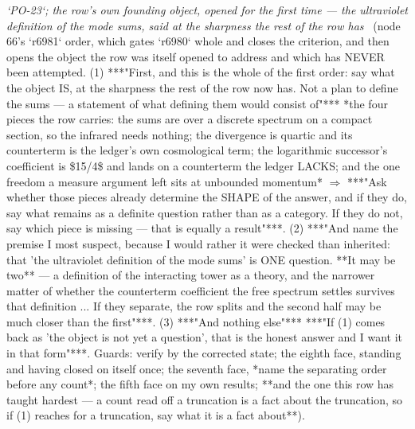 \begin{description}
\textit{`PO-23`; the row's own founding object, opened for the first time --- the ultraviolet definition of the mode sums, said at the sharpness the rest of the row has} \ (node 66's `r6981` order, which gates `r6980` whole and closes the criterion, and then opens the object the row was itself opened to address and which has NEVER been attempted. (1) ***"First, and this is the whole of the first order: say what the object IS, at the sharpness the rest of the row now has. Not a plan to define the sums --- a statement of what defining them would consist of"***  *the four pieces the row carries: the sums are over a discrete spectrum on a compact section, so the infrared needs nothing; the divergence is quartic and its counterterm is the ledger's own cosmological term; the logarithmic successor's coefficient is \$15/4\$ and lands on a counterterm the ledger LACKS; and the one freedom a measure argument left sits at unbounded momentum* \ensuremath{\Rightarrow} ***"Ask whether those pieces already determine the SHAPE of the answer, and if they do, say what remains as a definite question rather than as a category. If they do not, say which piece is missing --- that is equally a result"***. (2) ***"And name the premise I most suspect, because I would rather it were checked than inherited: that 'the ultraviolet definition of the mode sums' is ONE question. **It may be two** --- a definition of the interacting tower as a theory, and the narrower matter of whether the counterterm coefficient the free spectrum settles survives that definition ... If they separate, the row splits and the second half may be much closer than the first"***. (3) ***"And nothing else"***  ***"If (1) comes back as 'the object is not yet a question', that is the honest answer and I want it in that form"***.  Guards: verify by the corrected state; the eighth face, standing and having closed on itself once; the seventh face, *name the separating order before any count*; the fifth face on my own results; **and the one this row has taught hardest --- a count read off a truncation is a fact about the truncation, so if (1) reaches for a truncation, say what it is a fact about**). 

\end{description}
